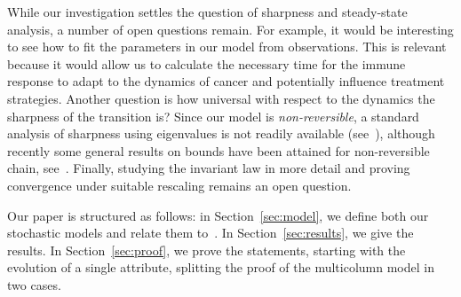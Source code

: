 \documentclass{article}
\numberwithin{equation}{section}
\newcommand{\1}{\mathbbm{1}}
\begin{document}
While our investigation settles the question of sharpness and steady-state analysis, a number of open questions remain. For example, it would be interesting to see how to fit the parameters in our model from observations. This is relevant because it would allow us to calculate the necessary time for the immune response to adapt to the dynamics of cancer and potentially influence treatment strategies. Another question is how universal with respect to the dynamics the sharpness of the transition is? Since our model is \textit{non-reversible}, a standard analysis of sharpness using eigenvalues is not readily available (see~\cite{levin2017markov}), although recently some general results on bounds have been attained for non-reversible chain, see~\cite{chatterjee2023spectral}. Finally, studying the invariant law in more detail and proving convergence under suitable rescaling remains an open question.

Our paper is structured as follows: in Section~\ref{sec:model}, we define both our stochastic models and relate them to~\cite{kuehn2025mathematicalmodelsselfadaptiveresponse}. In Section~\ref{sec:results}, we give the results. In Section~\ref{sec:proof}, we prove the statements, starting with the evolution of a single attribute, splitting the proof of the multicolumn model in two cases.
\end{document}
